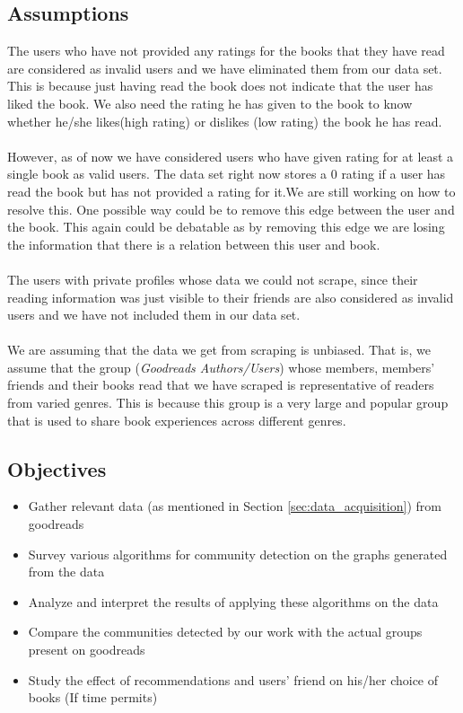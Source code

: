 \documentclass[11pt]{article}
\begin{document}
\subsection{Assumptions}
The users who have not provided any ratings for the books that they have read are considered as invalid users and we have eliminated them from our data set. This is because just having read the book does not indicate that the user has liked the book. We also need the rating he has given to the book to know whether he/she likes(high rating) or dislikes (low rating) the book he has read.\\\\
However, as of now we have considered users who have given rating for at least a single book as valid users. The data set right now stores a 0 rating if a user has read the book but has not provided a rating for it.We are still working on how to resolve this. One possible way could be to remove this edge between the user and the book. This again could be debatable as by removing this edge we are losing the information that there is a relation between this user and book.\\\\
The users with private profiles whose data we could not scrape, since their reading information was just visible to their friends are also considered as invalid users and we have not included them in our data set.\\\\
We are assuming that the data we get from scraping is unbiased. That is, we assume that the group ({\it Goodreads Authors/Users}) whose members, members' friends and their books read that we have scraped is representative of readers from varied genres. This is because this group is a very large and popular group that is used to share book experiences across different genres.

\subsection{Objectives}

\begin{itemize}
\item Gather relevant data (as mentioned in Section \ref{sec:data_acquisition}) from goodreads \checkmark
\item Survey various algorithms for community detection on the graphs generated from the data \checkmark
\item Analyze and interpret the results of applying these algorithms on the data 
\item Compare the communities detected by our work with the actual groups present on goodreads
\item Study the effect of recommendations and users' friend on his/her choice of books (If time permits)
\end{itemize}
\end{document}
